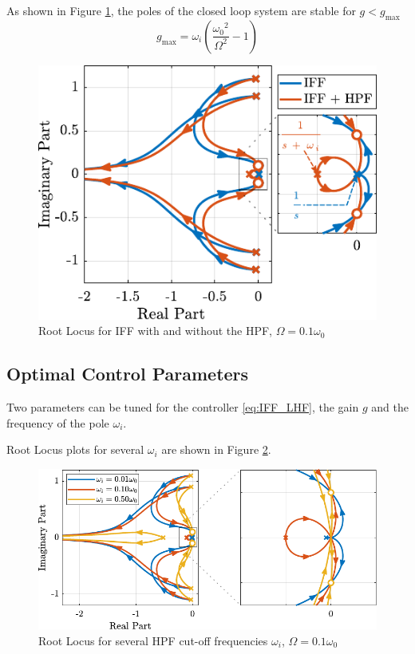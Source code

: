 \documentclass{ISMA_USD2020}
\begin{document}
As shown in Figure \ref{fig:root_locus_modified_iff}, the poles of the closed loop system are stable for \(g < g_\text{max}\)
\begin{equation}
  g_{\text{max}} = \omega_i \left( \frac{{\omega_0}^2}{\Omega^2} - 1 \right)
\end{equation}


\begin{figure}[htbp]
\centering
\includegraphics[scale=1]{figs/root_locus_modified_iff.pdf}
\caption{\label{fig:root_locus_modified_iff}Root Locus for IFF with and without the HPF, \(\Omega = 0.1 \omega_0\)}
\end{figure}

\subsection{Optimal Control Parameters}
\label{sec:org6e31c47}

Two parameters can be tuned for the controller \eqref{eq:IFF_LHF}, the gain \(g\) and the frequency of the pole \(\omega_i\).

Root Locus plots for several \(\omega_i\) are shown in Figure \ref{fig:root_locus_wi_modified_iff}.

\begin{figure}[htbp]
\centering
\includegraphics[scale=1]{figs/root_locus_wi_modified_iff.pdf}
\caption{\label{fig:root_locus_wi_modified_iff}Root Locus for several HPF cut-off frequencies \(\omega_i\), \(\Omega = 0.1 \omega_0\)}
\end{figure}
\end{document}

